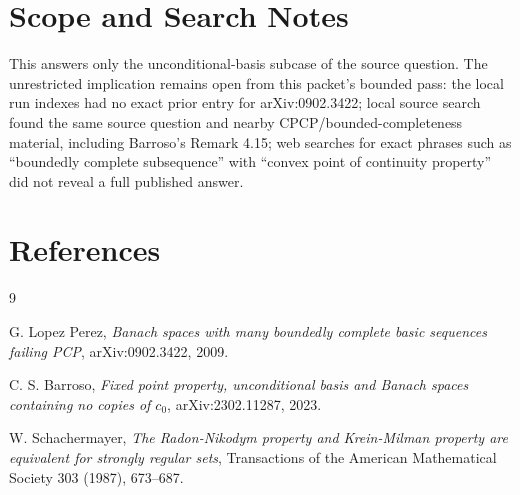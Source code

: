 \documentclass[11pt]{article}
\begin{document}
\section*{Scope and Search Notes}

This answers only the unconditional-basis subcase of the source question. The unrestricted implication remains open from this packet's bounded pass: the local run indexes had no exact prior entry for arXiv:0902.3422; local source search found the same source question and nearby CPCP/bounded-completeness material, including Barroso's Remark 4.15; web searches for exact phrases such as ``boundedly complete subsequence'' with ``convex point of continuity property'' did not reveal a full published answer.

\section*{References}

\begin{thebibliography}{9}

G. Lopez Perez,
\emph{Banach spaces with many boundedly complete basic sequences failing PCP},
arXiv:0902.3422, 2009.

C. S. Barroso,
\emph{Fixed point property, unconditional basis and Banach spaces containing no copies of \(c_0\)},
arXiv:2302.11287, 2023.

W. Schachermayer,
\emph{The Radon-Nikodym property and Krein-Milman property are equivalent for strongly regular sets},
Transactions of the American Mathematical Society 303 (1987), 673--687.

\end{thebibliography}
\end{document}
